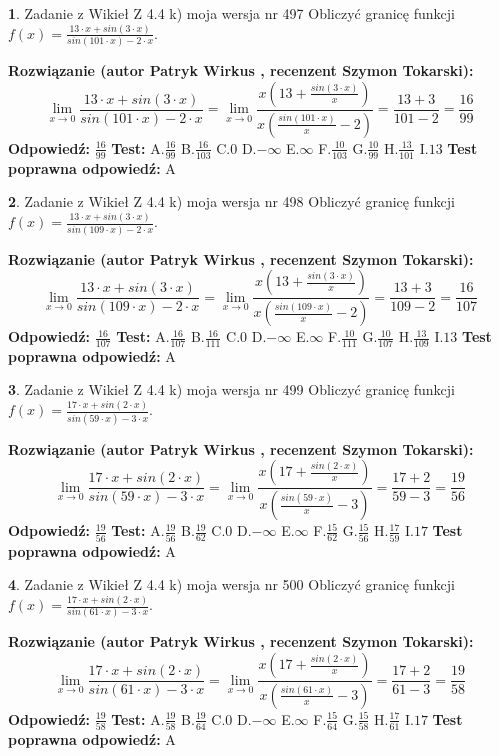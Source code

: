\documentclass[12pt, a4paper]{article}
\theoremstyle{definition} %
\newtheorem{zad}{}
\newcommand{\zadStart}[1]{\begin{zad}#1\newline}
\newcommand{\zadStop}{\end{zad}}
\newcommand{\rozwStart}[2]{\noindent \textbf{Rozwiązanie (autor #1 , recenzent #2): }\newline}
\newcommand{\rozwStop}{\newline}
\newcommand{\odpStart}{\noindent \textbf{Odpowiedź:}\newline}
\newcommand{\odpStop}{\newline}
\newcommand{\testStart}{\noindent \textbf{Test:}\newline}
\newcommand{\testStop}{\newline}
\newcommand{\kluczStart}{\noindent \textbf{Test poprawna odpowiedź:}\newline}
\newcommand{\kluczStop}{\newline}
\begin{document}
\zadStart{Zadanie z Wikieł Z 4.4 k) moja wersja nr 497}
Obliczyć granicę funkcji $f(x)=\frac{13\cdot x +sin(3\cdot x)}{sin(101\cdot x) -2\cdot x}$.
\zadStop
\rozwStart{Patryk Wirkus}{Szymon Tokarski}
$$\lim\limits_{x\to 0}\frac{13\cdot x +sin(3\cdot x)}{sin(101\cdot x) -2\cdot x}
=\lim\limits_{x\to 0}\frac{x(13+\frac{sin(3\cdot x)}{x})}{x(\frac{sin(101\cdot x)}{x}-2)}
=\frac{13+3}{101-2} = \frac{16}{99}$$
\rozwStop
\odpStart
$\frac{16}{99}$
\odpStop
\testStart
A.$\frac{16}{99}$
B.$\frac{16}{103}$
C.$0$
D.$-\infty$
E.$\infty$
F.$\frac{10}{103}$
G.$\frac{10}{99}$
H.$\frac{13}{101}$
I.$13$
\testStop
\kluczStart
A
\kluczStop



\zadStart{Zadanie z Wikieł Z 4.4 k) moja wersja nr 498}
Obliczyć granicę funkcji $f(x)=\frac{13\cdot x +sin(3\cdot x)}{sin(109\cdot x) -2\cdot x}$.
\zadStop
\rozwStart{Patryk Wirkus}{Szymon Tokarski}
$$\lim\limits_{x\to 0}\frac{13\cdot x +sin(3\cdot x)}{sin(109\cdot x) -2\cdot x}
=\lim\limits_{x\to 0}\frac{x(13+\frac{sin(3\cdot x)}{x})}{x(\frac{sin(109\cdot x)}{x}-2)}
=\frac{13+3}{109-2} = \frac{16}{107}$$
\rozwStop
\odpStart
$\frac{16}{107}$
\odpStop
\testStart
A.$\frac{16}{107}$
B.$\frac{16}{111}$
C.$0$
D.$-\infty$
E.$\infty$
F.$\frac{10}{111}$
G.$\frac{10}{107}$
H.$\frac{13}{109}$
I.$13$
\testStop
\kluczStart
A
\kluczStop



\zadStart{Zadanie z Wikieł Z 4.4 k) moja wersja nr 499}
Obliczyć granicę funkcji $f(x)=\frac{17\cdot x +sin(2\cdot x)}{sin(59\cdot x) -3\cdot x}$.
\zadStop
\rozwStart{Patryk Wirkus}{Szymon Tokarski}
$$\lim\limits_{x\to 0}\frac{17\cdot x +sin(2\cdot x)}{sin(59\cdot x) -3\cdot x}
=\lim\limits_{x\to 0}\frac{x(17+\frac{sin(2\cdot x)}{x})}{x(\frac{sin(59\cdot x)}{x}-3)}
=\frac{17+2}{59-3} = \frac{19}{56}$$
\rozwStop
\odpStart
$\frac{19}{56}$
\odpStop
\testStart
A.$\frac{19}{56}$
B.$\frac{19}{62}$
C.$0$
D.$-\infty$
E.$\infty$
F.$\frac{15}{62}$
G.$\frac{15}{56}$
H.$\frac{17}{59}$
I.$17$
\testStop
\kluczStart
A
\kluczStop



\zadStart{Zadanie z Wikieł Z 4.4 k) moja wersja nr 500}
Obliczyć granicę funkcji $f(x)=\frac{17\cdot x +sin(2\cdot x)}{sin(61\cdot x) -3\cdot x}$.
\zadStop
\rozwStart{Patryk Wirkus}{Szymon Tokarski}
$$\lim\limits_{x\to 0}\frac{17\cdot x +sin(2\cdot x)}{sin(61\cdot x) -3\cdot x}
=\lim\limits_{x\to 0}\frac{x(17+\frac{sin(2\cdot x)}{x})}{x(\frac{sin(61\cdot x)}{x}-3)}
=\frac{17+2}{61-3} = \frac{19}{58}$$
\rozwStop
\odpStart
$\frac{19}{58}$
\odpStop
\testStart
A.$\frac{19}{58}$
B.$\frac{19}{64}$
C.$0$
D.$-\infty$
E.$\infty$
F.$\frac{15}{64}$
G.$\frac{15}{58}$
H.$\frac{17}{61}$
I.$17$
\testStop
\kluczStart
A
\kluczStop
\end{document}
